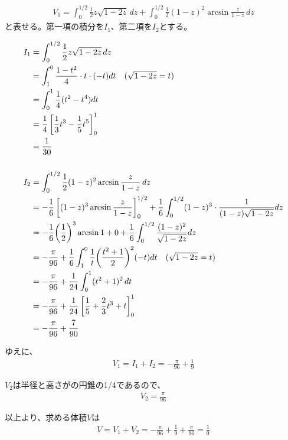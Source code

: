 \begin{enumerate}[label=(\arabic*)]
  \begin{gather}
    V_1
    = \int_{0}^{1/2}\frac{1}{2}z\sqrt{1-2z}\,dz
      + \int_{0}^{1/2}\frac{1}{2} (1-z)^2\arcsin \frac{z}{1-z}\,dz
  \end{gather}
  と表せる。第一項の積分を$I_1$、第二項を$I_2$とする。

  \begin{align}
    I_1
    &= \int_{0}^{1/2}\frac{1}{2}z\sqrt{1-2z}\,dz \\
    &= \int_{1}^{0}\frac{1-t^2}{4}\cdot t \cdot (-t)dt \quad(\sqrt{1-2z} = t) \\
    &= \int_{0}^{1}\frac{1}{4}(t^2 - t^4)dt \\
    &= \frac{1}{4}\left[\frac{1}{3}t^3 - \frac{1}{5}t^5\right]_{0}^{1} \\
    &= \frac{1}{30} \\
    \notag \\
    I_2
    &= \int_{0}^{1/2}\frac{1}{2} (1-z)^2\arcsin \frac{z}{1-z}\,dz \\
    &= -\frac{1}{6}\left[(1-z)^3 \arcsin\frac{z}{1-z}\right]_{0}^{1/2}
      + \frac{1}{6}\int_{0}^{1/2}(1-z)^3 \cdot \frac{1}{(1-z)\sqrt{1-2z}}dz \\
    &= -\frac{1}{6}\biggl(\frac{1}{2}\biggr)^3 \arcsin 1 + 0
      + \frac{1}{6} \int_{0}^{1/2}\frac{(1-z)^2}{\sqrt{1-2z}}dz \\
    &= -\frac{\pi}{96}
      + \frac{1}{6}\int_{1}^{0}\frac{1}{t}\biggl(\frac{t^2+1}{2}\biggr)^2 (-t)dt \quad(\sqrt{1-2z} = t) \\
    &= -\frac{\pi}{96} + \frac{1}{24}\int_{0}^{1}(t^2+1)^2 \,dt \\
    &= -\frac{\pi}{96} + \frac{1}{24}\left[\frac{1}{5} + \frac{2}{3}t^3 + t\right]_{0}^{1} \\
    &= -\frac{\pi}{96} + \frac{7}{90}
  \end{align}

  ゆえに、
  \begin{gather}
    V_1 = I_1 + I_2 = -\frac{\pi}{96} + \frac{1}{9}
  \end{gather}

  $V_2$は半径と高さがの円錐の1/4であるので、
  \begin{gather}
    V_2 = \frac{\pi}{96}
  \end{gather}

  以上より、求める体積$V$は
  \begin{gather}
    V = V_1 + V_2 = -\frac{\pi}{96} + \frac{1}{9} + \frac{\pi}{96} = \frac{1}{9}
  \end{gather}
\end{enumerate}

